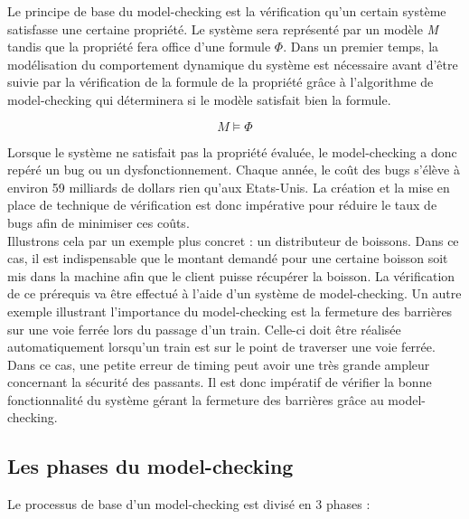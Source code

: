\documentclass[runningheads,a4paper,10pt]{llncs}
\begin{document}
\noindent
Le principe de base du model-checking est la vérification qu'un certain système satisfasse une certaine propriété. Le système sera représenté par un modèle \textit{M} tandis que la propriété fera office d'une formule $\Phi$. Dans un premier temps, la modélisation du comportement dynamique du système est nécessaire avant d'être suivie par la vérification de la formule de la propriété grâce à l'algorithme de model-checking qui déterminera si le modèle satisfait bien la formule.  

$$\boxed{\textit{M} \vDash \Phi}$$

\noindent
Lorsque le système ne satisfait pas la propriété évaluée, le model-checking a donc repéré un bug ou un dysfonctionnement. Chaque année, le coût des bugs s'élève à environ 59 milliards de dollars \cite{ErrorCost} rien qu'aux Etats-Unis. La création et la mise en place de technique de vérification est donc impérative pour réduire le taux de bugs afin de minimiser ces coûts.  \\

\noindent
Illustrons cela par un exemple plus concret : un distributeur de boissons. Dans ce cas, il est indispensable que le montant demandé pour une certaine boisson soit mis dans la machine afin que le client puisse récupérer la boisson. La vérification de ce prérequis va être effectué à l'aide d'un système de model-checking. 
Un autre exemple illustrant l'importance du model-checking est la fermeture des barrières sur une voie ferrée lors du passage d'un train. 
Celle-ci doit être réalisée automatiquement lorsqu'un train est sur le point de traverser une voie ferrée. Dans ce cas, une petite erreur de timing peut avoir une très grande ampleur concernant la sécurité des passants. Il est donc impératif de vérifier la bonne fonctionnalité du système gérant la fermeture des barrières grâce au model-checking. 

\noindent 

\subsection{Les phases du model-checking}

Le processus de base d'un model-checking est divisé en 3 phases : 
\end{document}
